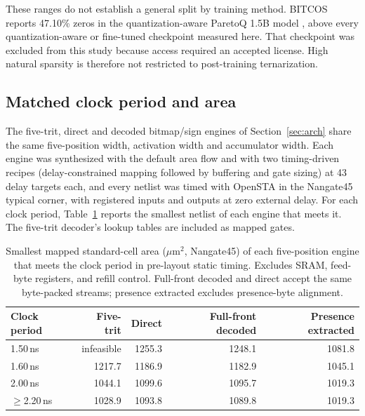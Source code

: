\documentclass[11pt]{article}
\begin{document}
These ranges do not establish a general split by training method. BITCOS
reports 47.10\% zeros in the quantization-aware ParetoQ 1.5B model
\cite{georganas2026bitcos}, above every quantization-aware or fine-tuned
checkpoint measured here. That checkpoint was excluded from this study
because access required an accepted license. High natural sparsity is
therefore not restricted to post-training ternarization.

\subsection{Matched clock period and area}

The five-trit, direct and decoded bitmap/sign engines of
Section~\ref{sec:arch} share the same five-position width, activation width
and accumulator width. Each engine was synthesized with the default area flow and with two
timing-driven recipes (delay-constrained mapping followed by buffering and
gate sizing) at 43 delay targets each, and every netlist was timed with
OpenSTA in the Nangate45 typical corner, with registered inputs and outputs
at zero external delay. For each clock period, Table~\ref{tab:frontier}
reports the smallest netlist of each engine that meets it. The five-trit
decoder's lookup tables are included as mapped gates.

\begin{table}[h]
\centering
\caption{Smallest mapped standard-cell area ($\mu\mathrm{m}^2$, Nangate45) of each five-position engine that meets the clock period in pre-layout static timing. Excludes SRAM, feed-byte registers, and refill control. Full-front decoded and direct accept the same byte-packed streams; presence extracted excludes presence-byte alignment.}
\label{tab:frontier}
\begin{tabular}{lrrrr}
\toprule
Clock period & Five-trit & Direct & Full-front decoded & Presence extracted \\
\midrule
1.50\,ns & infeasible & 1255.3 & 1248.1 & 1081.8 \\
1.60\,ns & 1217.7 & 1186.9 & 1182.9 & 1045.1 \\
2.00\,ns & 1044.1 & 1099.6 & 1095.7 & 1019.3 \\
$\geq$2.20\,ns & 1028.9 & 1093.8 & 1089.8 & 1019.3 \\
\bottomrule
\end{tabular}
\end{table}
\end{document}
